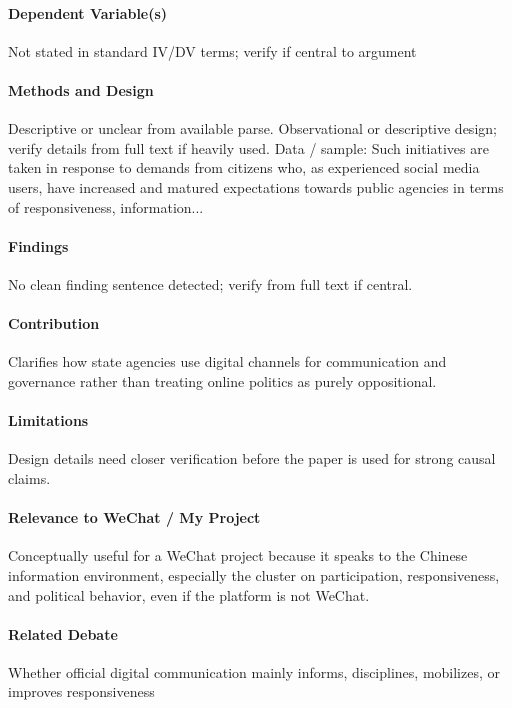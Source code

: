 \documentclass[12pt]{article}
\begin{document}
\paragraph{Dependent Variable(s)} Not stated in standard IV/DV terms; verify if central to argument

\paragraph{Methods and Design} Descriptive or unclear from available parse. Observational or descriptive design; verify details from full text if heavily used. Data / sample: Such initiatives are taken in response to demands from citizens who, as experienced social media users, have increased and matured expectations towards public agencies in terms of responsiveness, information...

\paragraph{Findings} No clean finding sentence detected; verify from full text if central.

\paragraph{Contribution} Clarifies how state agencies use digital channels for communication and governance rather than treating online politics as purely oppositional.

\paragraph{Limitations} Design details need closer verification before the paper is used for strong causal claims.

\paragraph{Relevance to WeChat / My Project} Conceptually useful for a WeChat project because it speaks to the Chinese information environment, especially the cluster on participation, responsiveness, and political behavior, even if the platform is not WeChat.

\paragraph{Related Debate} Whether official digital communication mainly informs, disciplines, mobilizes, or improves responsiveness
\end{document}
